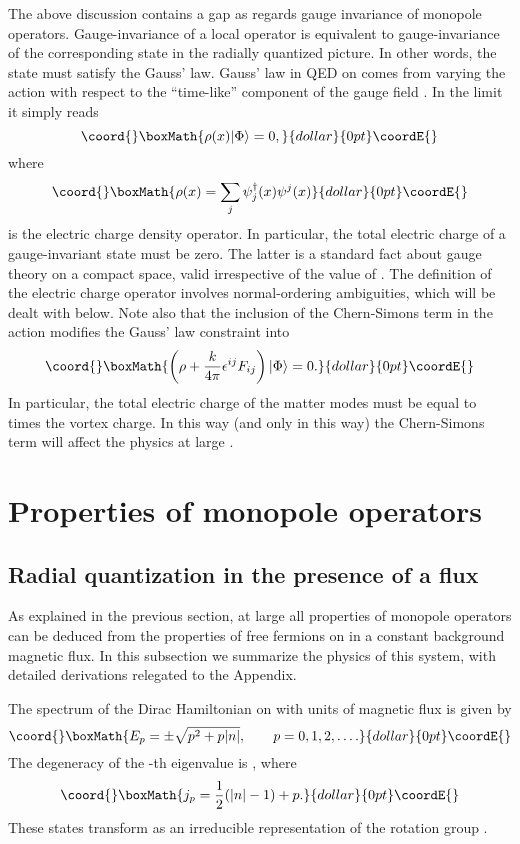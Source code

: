 \documentclass[a4paper,12pt, amsfonts, amssymb]{article}
\providecommand{\RR}{{\mathbb R}}
\providecommand{\ra}{\rightarrow}
\providecommand{\eps}{\epsilon}
\begin{document}
The above discussion contains a gap as regards gauge invariance of
monopole operators. Gauge-invariance of a local operator is equivalent
to gauge-invariance of the corresponding state in the
radially quantized picture.
In other words, the state must satisfy the Gauss' law. Gauss' law
in QED on \myHighlight{${\bf S}^2\times \RR$}\coordHE{} comes from varying the action with
respect to the ``time-like'' component of the gauge field \coordHE{}. In the
limit \myHighlight{$e\ra\infty$}\coordHE{} it simply reads
$$\coord{}\boxMath{
\rho(x) \vert \Phi\rangle =0,
}{dollar}{0pt}\coordE{}$$
where 
$$\coord{}\boxMath{\rho(x)=\sum_j\psi_j^\dag(x)\psi^j(x)
}{dollar}{0pt}\coordE{}$$ 
is the electric charge density operator.
In particular, the total electric charge of a gauge-invariant state must
be zero. The latter is a standard fact about gauge theory on a compact space,
valid irrespective of the value of \coordHE{}. The definition of the
electric charge operator involves normal-ordering ambiguities,
which will be dealt with below. Note also that the inclusion of the
Chern-Simons term in the action modifies the Gauss' law constraint into
$$\coord{}\boxMath{
\left(\rho + \frac{k}{4\pi}\eps^{ij} F_{ij}\right)\vert\Phi\rangle =0.
}{dollar}{0pt}\coordE{}$$
In particular, the total electric charge of the matter modes must be
equal to \coordHE{} times the vortex charge. In this way (and only in this way)
the Chern-Simons term will affect the physics at large \coordHE{}.
 
\section{Properties of monopole operators}
 
\subsection{Radial quantization in the presence of a flux}

As explained in the previous section, at large \coordHE{} all properties of
monopole operators can be deduced from the properties of free fermions on
\myHighlight{${\bf S}^2\times \RR$}\coordHE{} in a constant background magnetic flux. In this 
subsection we summarize the physics of this system, with detailed
derivations relegated to the Appendix.

The spectrum of the Dirac Hamiltonian on \myHighlight{${\bf S}^2\times \RR$}\coordHE{} with
\coordHE{} units of magnetic flux is given by
$$\coord{}\boxMath{
E_p=\pm {\sqrt{p^2+p|n|}},\qquad p=0,1,2,\ldots .
}{dollar}{0pt}\coordE{}$$
The degeneracy of the \coordHE{}-th eigenvalue is \coordHE{}, where
$$\coord{}\boxMath{
j_p=\frac{1}{2}(|n|-1)+p.
}{dollar}{0pt}\coordE{}$$
These \coordHE{} states transform as an irreducible representation of
the rotation group \coordHE{}.
\end{document}
